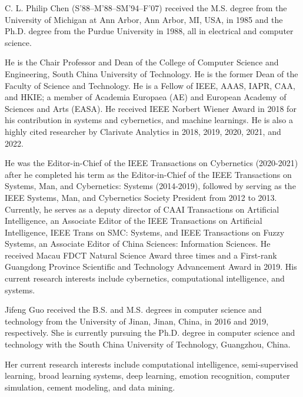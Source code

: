 \documentclass[lettersize,journal]{IEEEtran}
\begin{document}
\begin{IEEEbiography}{C. L. Philip Chen}
	(S’88–M’88–SM’94–F’07) received the M.S. degree from the University of Michigan at Ann Arbor, Ann Arbor, MI, USA, in 1985 and the Ph.D. degree from the Purdue University in 1988, all in electrical and computer science.
	 
	He is the Chair Professor and Dean of the College of Computer Science and Engineering, South China University of Technology. He is the former Dean of the Faculty of Science and Technology. He is a Fellow of IEEE, AAAS, IAPR, CAA, and HKIE; a member of Academia Europaea (AE) and European Academy of Sciences and Arts (EASA). He received IEEE Norbert Wiener Award in 2018 for his contribution in systems and cybernetics, and machine learnings. He is also a highly cited researcher by Clarivate Analytics in 2018, 2019, 2020, 2021, and 2022. 
	
	He was the Editor-in-Chief of the IEEE Transactions on Cybernetics (2020-2021) after he completed his term as the Editor-in-Chief of the IEEE Transactions on Systems, Man, and Cybernetics: Systems (2014-2019), followed by serving as the IEEE Systems, Man, and Cybernetics Society President from 2012 to 2013. Currently, he serves as a deputy director of CAAI Transactions on Artificial Intelligence, an Associate Editor of the IEEE Transactions on Artificial Intelligence, IEEE Trans on SMC: Systems, and IEEE Transactions on Fuzzy Systems, an Associate Editor of China Sciences: Information Sciences. He received Macau FDCT Natural Science Award three times and a First-rank Guangdong Province Scientific and Technology Advancement Award in 2019. His current research interests include cybernetics, computational intelligence, and systems.
\end{IEEEbiography}

\begin{IEEEbiography}{Jifeng Guo}
	received the B.S. and M.S. degrees in computer science and technology from the University of Jinan, Jinan, China, in 2016 and 2019, respectively. She is currently pursuing the Ph.D. degree in computer science and technology with the South China University of Technology, Guangzhou, China.
	
    Her current research interests include computational intelligence, semi-supervised learning, broad learning systems, deep learning, emotion recognition, computer simulation, cement modeling, and data mining.
\end{IEEEbiography}
\end{document}
